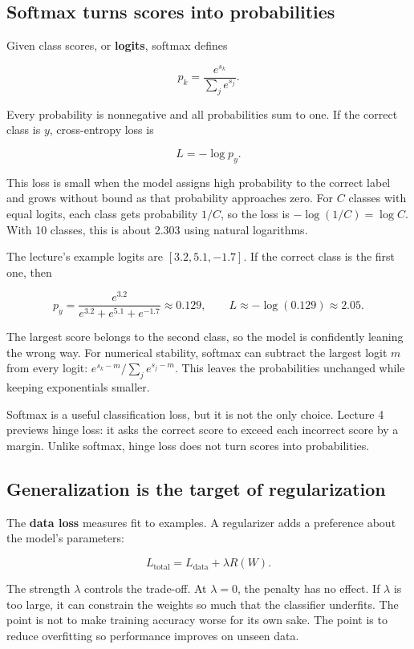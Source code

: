 \subsection{Softmax turns scores into probabilities}\label{04-visual-computing-ii-ch031-softmax-turns-scores-into-probabilities}

Given class scores, or \textbf{logits}, softmax defines

\[p_k=\frac{e^{s_k}}{\sum_j e^{s_j}}.\]

Every probability is nonnegative and all probabilities sum to one. If the correct class is \(y\), cross-entropy loss is

\[L=-\log p_y.\]

This loss is small when the model assigns high probability to the correct label and grows without bound as that probability approaches zero. For \(C\) classes with equal logits, each class gets probability \(1/C\), so the loss is \(-\log(1/C)=\log C\). With 10 classes, this is about 2.303 using natural logarithms.

The lecture's example logits are \([3.2,5.1,-1.7]\). If the correct class is the first one, then

\[p_y=\frac{e^{3.2}}{e^{3.2}+e^{5.1}+e^{-1.7}}\approx0.129, \qquad L\approx-\log(0.129)\approx2.05.\]

The largest score belongs to the second class, so the model is confidently leaning the wrong way. For numerical stability, softmax can subtract the largest logit \(m\) from every logit: \(e^{s_k-m}/\sum_j e^{s_j-m}\). This leaves the probabilities unchanged while keeping exponentials smaller.

Softmax is a useful classification loss, but it is not the only choice. Lecture 4 previews hinge loss: it asks the correct score to exceed each incorrect score by a margin. Unlike softmax, hinge loss does not turn scores into probabilities.

\subsection{Generalization is the target of regularization}\label{04-visual-computing-ii-ch031-generalization-is-the-target-of-regularization}

The \textbf{data loss} measures fit to examples. A regularizer adds a preference about the model's parameters:

\[L_{\text{total}}=L_{\text{data}}+\lambda R(W).\]

The strength \(\lambda\) controls the trade-off. At \(\lambda=0\), the penalty has no effect. If \(\lambda\) is too large, it can constrain the weights so much that the classifier underfits. The point is not to make training accuracy worse for its own sake. The point is to reduce overfitting so performance improves on unseen data.

